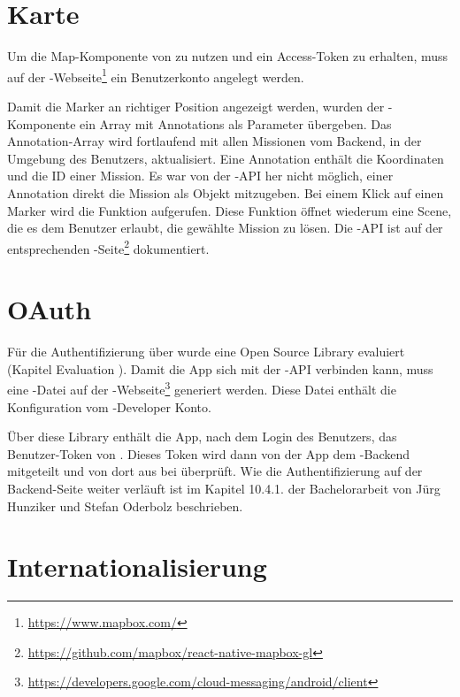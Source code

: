 \section{Karte}
Um die Map-Komponente von  zu nutzen und ein Access-Token zu erhalten, muss auf der -Webseite\footnote{\url{https://www.mapbox.com/}} ein Benutzerkonto angelegt werden. 

Damit die Marker an richtiger Position angezeigt werden, wurden der -Komponente ein Array mit Annotations als Parameter übergeben. 
Das Annotation-Array wird fortlaufend mit allen Missionen vom \gls{Backend}, in der Umgebung des Benutzers, aktualisiert. 
Eine Annotation enthält die Koordinaten und die ID einer Mission. 
Es war von der -\gls{API} her nicht möglich, einer Annotation direkt die Mission als Objekt mitzugeben. 
Bei einem Klick auf einen Marker wird die Funktion  aufgerufen.
Diese Funktion öffnet wiederum eine Scene, die es dem Benutzer erlaubt, die gewählte Mission zu lösen.
Die -\gls{API} ist auf der entsprechenden -Seite\footnote{\url{https://github.com/mapbox/react-native-mapbox-gl}} dokumentiert. 


\section{OAuth}
Für die Authentifizierung über  wurde eine Open Source \gls{Library} evaluiert (Kapitel Evaluation ). 
Damit die App sich mit der -\gls{API} verbinden kann, muss eine -Datei auf der -Webseite\footnote{\url{https://developers.google.com/cloud-messaging/android/client}} generiert werden. 
Diese Datei enthält die Konfiguration vom -Developer Konto. 

Über diese \gls{Library} enthält die App, nach dem Login des Benutzers, das Benutzer-Token von .
Dieses Token wird dann von der App dem \kort{}-\gls{Backend} mitgeteilt und von dort aus bei  überprüft. 
Wie die Authentifizierung auf der \gls{Backend}-Seite weiter verläuft ist im Kapitel 10.4.1. der Bachelorarbeit von Jürg Hunziker und Stefan Oderbolz beschrieben.\cite{ba-kort-2012}


\section{Internationalisierung}


